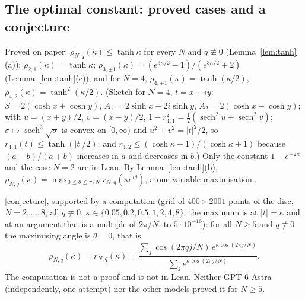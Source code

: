 \documentclass[11pt,a4paper]{article}
\theoremstyle{plain}
\theoremstyle{definition}
\theoremstyle{remark}
\numberwithin{equation}{section}
\newcommand{\st}[1]{\textsf{[#1]}}
\begin{document}
\subsection{The optimal constant: proved cases and a conjecture}
Proved on paper: $\rho_{N,q}(\kappa)\le\tanh\kappa$ for every $N$ and $q\not\equiv0$ (Lemma~\ref{lem:tanh}(a)); $\rho_{2,1}(\kappa)=\tanh\kappa$; $\rho_{3,\pm1}(\kappa)=(e^{3\kappa/2}-1)/(e^{3\kappa/2}+2)$ (Lemma~\ref{lem:tanh}(c)); and for $N=4$, $\rho_{4,\pm1}(\kappa)=\tanh(\kappa/2)$, $\rho_{4,2}(\kappa)=\tanh^2(\kappa/2)$. (Sketch for $N=4$, $t=x+iy$: $S=2(\cosh x+\cosh y)$, $A_1=2\sinh x-2i\sinh y$, $A_2=2(\cosh x-\cosh y)$; with $u=(x+y)/2$, $v=(x-y)/2$, $1-r_{4,1}^2=\tfrac12(\operatorname{sech}^2u+\operatorname{sech}^2v)$; $\sigma\mapsto\operatorname{sech}^2\sqrt\sigma$ is convex on $[0,\infty)$ and $u^2+v^2=|t|^2/2$, so $r_{4,1}(t)\le\tanh(|t|/2)$; and $r_{4,2}\le(\cosh\kappa-1)/(\cosh\kappa+1)$ because $(a-b)/(a+b)$ increases in $a$ and decreases in $b$.) Only the constant $1-e^{-2\kappa}$ and the case $N=2$ are in Lean. By Lemma~\ref{lem:tanh}(b), $\rho_{N,q}(\kappa)=\max_{0\le\theta\le\pi/N}r_{N,q}(\kappa e^{i\theta})$, a one-variable maximisation.

\st{conjecture}, supported by a computation (grid of $400\times2001$ points of the disc, $N=2,\dots,8$, all $q\not\equiv0$, $\kappa\in\{0.05,0.2,0.5,1,2,4,8\}$: the maximum is at $|t|=\kappa$ and at an argument that is a multiple of $2\pi/N$, to $5\cdot10^{-16}$): for all $N\ge5$ and $q\not\equiv0$ the maximising angle is $\theta=0$, that is
\[
\rho_{N,q}(\kappa)=r_{N,q}(\kappa)=\frac{\sum_j\cos(2\pi qj/N)\,e^{\kappa\cos(2\pi j/N)}}{\sum_je^{\kappa\cos(2\pi j/N)}} .
\]
The computation is not a proof and is not in Lean. Neither GPT-6 Astra (independently, one attempt) nor the other models proved it for $N\ge5$.
\end{document}
